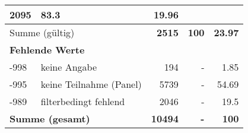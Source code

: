 \begin{longtable}{lXrrr}
       \num{2095} &
       \num[round-mode=places,round-precision=2]{83.3} &
         \num[round-mode=places,round-precision=2]{19.96} \\
     \midrule
     \multicolumn{2}{l}{Summe (gültig)} &
       \textbf{\num{2515}} &
     \textbf{\num{100}} &
       \textbf{\num[round-mode=places,round-precision=2]{23.97}} \\
     \multicolumn{5}{l}{\textbf{Fehlende Werte}}\\
       -998 &
       keine Angabe &
         \num{194} &
        - &
         \num[round-mode=places,round-precision=2]{1.85} \\
       -995 &
       keine Teilnahme (Panel) &
         \num{5739} &
        - &
         \num[round-mode=places,round-precision=2]{54.69} \\
       -989 &
       filterbedingt fehlend &
         \num{2046} &
        - &
         \num[round-mode=places,round-precision=2]{19.5} \\
     \midrule
     \multicolumn{2}{l}{\textbf{Summe (gesamt)}} &
          \textbf{\num{10494}} &
        \textbf{-} &
        \textbf{\num{100}} \\
     \bottomrule
     \end{longtable}
     
